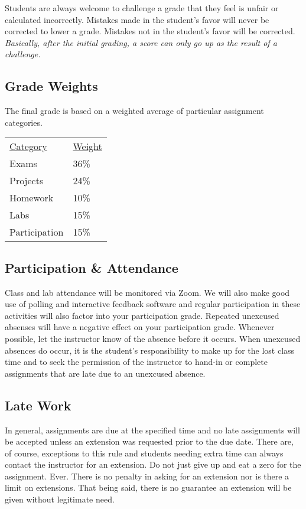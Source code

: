 \documentclass[10pt]{article}
\begin{document}
Students are always welcome to challenge a grade that they feel is unfair or calculated incorrectly.  Mistakes made in the student's favor will never be corrected to lower a grade.  Mistakes not in the student's favor will be corrected.  \textit{Basically, after the initial grading, a score can only go up as the result of a challenge.}



\subsection{Grade Weights}

The final grade is based on a weighted average of particular assignment categories.

\begin{center}
  \begin{tabular}{ll}
  \underline{Category} & \underline{Weight} \\
    Exams & 36\% \\ %
    Projects & 24\% \\ %
    Homework & 10\% \\ %
    Labs & 15\% \\ %
    Participation & 15\%
  \end{tabular}
\end{center}

\subsection{Participation \& Attendance}

Class and lab attendance will be monitored via Zoom. We will also make good use of polling and interactive feedback software and regular participation in these activities will also factor into your participation grade. Repeated unexcused absenses will have a negative effect on your participation grade. Whenever possible, let the instructor know of the absence before it occurs. When unexcused absences do occur, it is the student's responsibility to make up for the lost class time and to seek the permission of the instructor to hand-in or complete assignments that are late due to an unexcused absence.

\subsection{Late Work}

In general, assignments are due at the specified time and no late assignments will be accepted unless an extension was requested prior to the due date. There are, of course, exceptions to this rule and students needing extra time can always contact the instructor for an extension. Do not just give up and eat a zero for the assignment. Ever. There is no penalty in asking for an extension nor is there a limit on extensions.  That being said, there is no guarantee an extension will be given without legitimate need.
\end{document}
